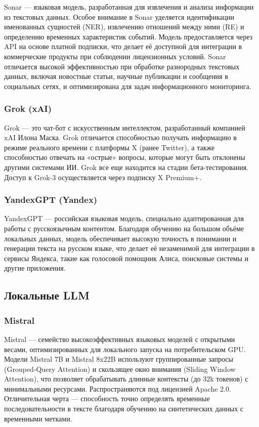 Sonar \cite{lib:sonar} — языковая модель, разработанная для извлечения и анализа информации из текстовых данных. Особое внимание в Sonar уделяется идентификации именованных сущностей (NER), извлечению отношений между ними (RE) и определению временных характеристик событий. Модель предоставляется через API на основе платной подписки, что делает её доступной для интеграции в коммерческие продукты при соблюдении лицензионных условий. Sonar отличается высокой эффективностью при обработке разнородных текстовых данных, включая новостные статьи, научные публикации и сообщения в социальных сетях, и оптимизирована для задач информационного мониторинга.

\subsubsection{Grok (xAI)}
Grok \cite{lib:grok} — это чат-бот с искусственным интеллектом, разработанный компанией xAI Илона Маска. Grok отличается способностью получать информацию в режиме реального времени с платформы X (ранее Twitter), а также способностью отвечать на «острые» вопросы, которые могут быть отклонены другими системами ИИ. Grok все еще находится на стадии бета-тестирования. Доступ к Grok-3 осуществляется через подписку X Premium+.

\subsubsection{YandexGPT (Yandex)}
YandexGPT \cite{lib:yandex} — российская языковая модель, специально адаптированная для работы с русскоязычным контентом. Благодаря обучению на большом объёме локальных данных, модель обеспечивает высокую точность в понимании и генерации текста на русском языке, что делает её незаменимой для интеграции в сервисы Яндекса, такие как голосовой помощник Алиса, поисковые системы и другие приложения.

\subsection{Локальные LLM}

\subsubsection{Mistral}
Mistral \cite{lib:mistral} — семейство высокоэффективных языковых моделей с открытыми весами, оптимизированных для локального запуска на потребительском GPU. Модели Mistral 7B и Mistral 8x22B используют группированные запросы (Grouped-Query Attention) и скользящее окно внимания (Sliding Window Attention), что позволяет обрабатывать длинные контексты (до 32k токенов) с минимальными ресурсами. Распространяются под лицензией Apache 2.0. Отличительная черта — способность точно определять временные последовательности в тексте благодаря обучению на синтетических данных с временными метками.


